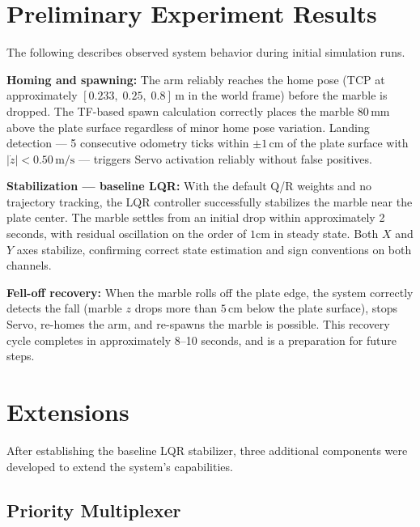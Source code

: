 \documentclass[journal]{IEEEtran}
\begin{document}
\section{Preliminary Experiment Results}

The following describes observed system behavior during initial simulation runs.

\textbf{Homing and spawning:} The arm reliably reaches the home pose (TCP at approximately
$[0.233,\;0.25,\;0.8]\,\mathrm{m}$ in the world frame) before the marble is dropped. The TF-based spawn
calculation correctly places the marble $80\,\mathrm{mm}$ above the plate surface regardless of minor home
pose variation. Landing detection — 5 consecutive odometry ticks within $\pm1\,\mathrm{cm}$ of the plate
surface with $|\dot{z}| < 0.50\,\mathrm{m/s}$ — triggers Servo activation reliably without false
positives.

\textbf{Stabilization — baseline LQR:} With the default Q/R weights and no trajectory tracking, the LQR
controller successfully stabilizes the marble near the plate center. The marble settles from an initial
drop within approximately 2 seconds, with residual oscillation on the order of $1 \mathrm{cm}$
in steady state. Both $X$ and $Y$ axes stabilize, confirming correct state estimation and sign conventions
on both channels.

\textbf{Fell-off recovery:} When the marble rolls off the plate edge, the system correctly detects the
fall (marble $z$ drops more than $5\,\mathrm{cm}$ below the plate surface), stops Servo, re-homes the arm,
and re-spawns the marble is possible. This recovery cycle completes in approximately 8--10 seconds, and is a preparation for future steps.

\section{Extensions}
\label{sec:extensions}

After establishing the baseline LQR stabilizer, three additional components were developed to extend the
system's capabilities.

\subsection{Priority Multiplexer}
\end{document}
